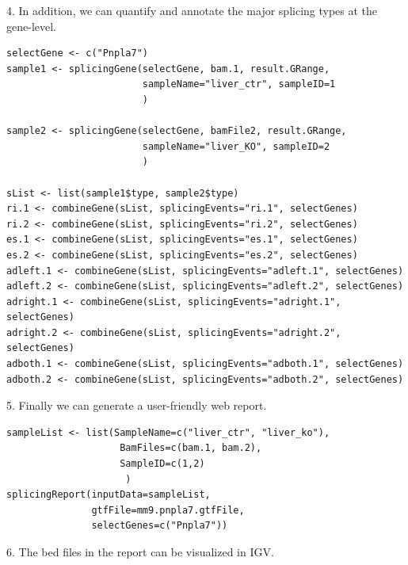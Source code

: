 \documentclass[a4paper]{article}
\begin{document}
4. In addition, we can quantify and annotate the major splicing types at the gene-level.
\begin{verbatim}
selectGene <- c("Pnpla7")
sample1 <- splicingGene(selectGene, bam.1, result.GRange,
                        sampleName="liver_ctr", sampleID=1
                        )

sample2 <- splicingGene(selectGene, bamFile2, result.GRange,
                        sampleName="liver_KO", sampleID=2
                        )

sList <- list(sample1$type, sample2$type)
ri.1 <- combineGene(sList, splicingEvents="ri.1", selectGenes)
ri.2 <- combineGene(sList, splicingEvents="ri.2", selectGenes)
es.1 <- combineGene(sList, splicingEvents="es.1", selectGenes)
es.2 <- combineGene(sList, splicingEvents="es.2", selectGenes)
adleft.1 <- combineGene(sList, splicingEvents="adleft.1", selectGenes)
adleft.2 <- combineGene(sList, splicingEvents="adleft.2", selectGenes)
adright.1 <- combineGene(sList, splicingEvents="adright.1", selectGenes)
adright.2 <- combineGene(sList, splicingEvents="adright.2", selectGenes)
adboth.1 <- combineGene(sList, splicingEvents="adboth.1", selectGenes)
adboth.2 <- combineGene(sList, splicingEvents="adboth.2", selectGenes)
\end{verbatim}
5. Finally we can generate a user-friendly web report.
\begin{verbatim}
sampleList <- list(SampleName=c("liver_ctr", "liver_ko"),
                    BamFiles=c(bam.1, bam.2),
                    SampleID=c(1,2)
                     )
splicingReport(inputData=sampleList, 
               gtfFile=mm9.pnpla7.gtfFile, 
               selectGenes=c("Pnpla7"))
\end{verbatim}
6. The bed files in the report can be visualized in IGV. 
\end{document}

